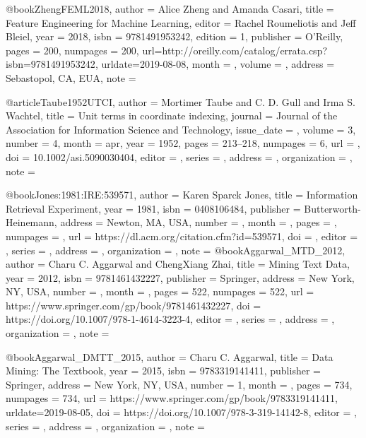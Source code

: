 @book{ZhengFEML2018,
    author = {Alice Zheng and Amanda Casari},
    title = {Feature Engineering for Machine Learning},
    editor = {Rachel Roumeliotis and Jeff Bleiel},
    year = {2018},
    isbn = {9781491953242},
    edition = {1},
    publisher = {O’Reilly},
    pages = {200},
    numpages = {200},
    url={http://oreilly.com/catalog/errata.csp?isbn=9781491953242},
    urldate={2019-08-08},
    month = {},
    volume   = {},
    address  = {Sebastopol, CA, EUA},
    note     = {}
} 

@article{Taube1952UTCI,
    author = {Mortimer Taube and C. D. Gull and Irma S. Wachtel},
    title = {Unit terms in coordinate indexing},
    journal = {Journal of the Association for Information Science and Technology},
    issue_date = {},
    volume = {3},
    number = {4},
    month = apr,
    year = {1952},
    pages = {213--218},
    numpages = {6},
    url = {},
    doi = {10.1002/asi.5090030404},
    editor		= {},
    series		= {},
    address	= {},
    organization	= {},
    note		= {}
} 

@book{Jones:1981:IRE:539571,
    author = {Karen Sparck Jones},
    title = {Information Retrieval Experiment},
    year = {1981},
    isbn = {0408106484},
    publisher = {Butterworth-Heinemann},
    address = {Newton, MA, USA},
    number = {},
    month = {},
    pages = {},
    numpages = {},
    url = {https://dl.acm.org/citation.cfm?id=539571},
    doi = {},
    editor		= {},
    series		= {},
    address	= {},
    organization	= {},
    note		= {}
} 
@book{Aggarwal_MTD_2012,
    author = {Charu C. Aggarwal and ChengXiang Zhai},
    title = {Mining Text Data},
    year = {2012},
    isbn = {9781461432227},
    publisher = {Springer},
    address = {New York, NY, USA},
    number = {},
    month = {},
    pages = {522},
    numpages = {522},
    url = {https://www.springer.com/gp/book/9781461432227},
    doi = {https://doi.org/10.1007/978-1-4614-3223-4},
    editor		= {},
    series		= {},
    address	= {},
    organization	= {},
    note		= {}
} 

@book{Aggarwal_DMTT_2015,
    author = {Charu C. Aggarwal},
    title = {Data Mining: The Textbook},
    year = {2015},
    isbn = {9783319141411},
    publisher = {Springer},
    address = {New York, NY, USA},
    number = {1},
    month = {},
    pages = {734},
    numpages = {734},
    url = {https://www.springer.com/gp/book/9783319141411},
    urldate={2019-08-05},
    doi = {https://doi.org/10.1007/978-3-319-14142-8},
    editor		= {},
    series		= {},
    address	= {},
    organization	= {},
    note		= {}
} 


